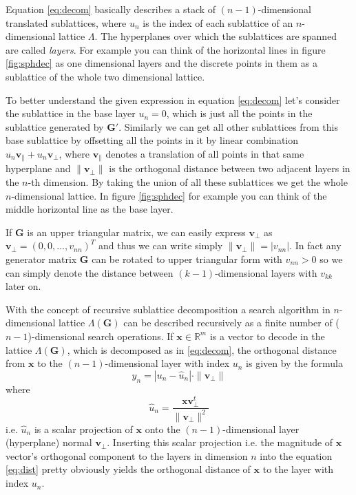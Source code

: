 \documentclass[english,12pt,a4paper,pdftex,sci,utf8]{aaltothesis}
\begin{document}
\noindent Equation \eqref{eq:decom} basically describes a stack of $(n-1)$-dimensional translated sublattices, where $u_n$ is the index of each sublattice of an $n$-dimensional lattice $\Lambda$. The hyperplanes over which the sublattices are spanned are called \textit{layers}. For example you can think of the horizontal lines in figure \ref{fig:sphdec} as one dimensional layers and the discrete points in them as a sublattice of the whole two dimensional lattice. 
\par To better understand the given expression in equation \eqref{eq:decom} let's consider the sublattice in the base layer $u_n = 0$, which is just all the points in the sublattice generated by $\mathbf{G}'$. Similarly we can get all other sublattices from this base sublattice by offsetting all the points in it by linear combination $u_n\mathbf{v}_{\parallel}+u_n\mathbf{v}_{\bot}$, where $\mathbf{v}_{\parallel}$ denotes a translation of all points in that same hyperplane and $\|\mathbf{v}_{\bot}\|$ is the orthogonal distance between two adjacent layers in the $n$-th dimension. By taking the union of all these sublattices we get the whole $n$-dimensional lattice. In figure \ref{fig:sphdec} for example you can think of the middle horizontal line as the base layer.
\par If $\mathbf{G}$ is an upper triangular matrix, we can easily express $\mathbf{v}_{\bot}$ as $\mathbf{v}_{\bot} = (0, 0, ..., v_{nn})^T$ and thus we can write simply $\|\mathbf{v}_{\bot}\| = |v_{nn}|$. In fact any generator matrix $\mathbf{G}$ can be rotated to upper triangular form \cite{agrell} with $v_{nn} > 0$ so we can simply denote the distance between $(k-1)$-dimensional layers with $v_{kk}$ later on.
\par With the concept of recursive sublattice decomposition a search algorithm in $n$-dimensional lattice $\Lambda(\mathbf{G})$ can be described recursively as a finite number of ($n-1$)-dimensional search operations. If $\mathbf{x} \in \mathbb{R}^m$ is a vector to decode in the lattice $\Lambda(\mathbf{G})$, which is decomposed as in \eqref{eq:decom}, the orthogonal distance from $\mathbf{x}$ to the $(n-1)$-dimensional layer with index $u_n$ is given by the formula
\begin{equation}
y_n = |u_n-\hat{u}_n| \cdot \|\mathbf{v}_{\bot}\|
\label{eq:dist}
\end{equation}
where
\begin{equation}
\hat{u}_n = \frac{\mathbf{xv}_{\bot}^t}{\|\mathbf{v}_{\bot}\|^2}
\label{eq:uhat}
\end{equation}
i.e. $\hat{u}_n$ is a scalar projection of $\mathbf{x}$ onto the $(n-1)$-dimensional layer (hyperplane) normal $\mathbf{v}_{\bot}$. Inserting this scalar projection i.e. the magnitude of $\mathbf{x}$ vector's orthogonal component to the layers in dimension $n$ into the equation \eqref{eq:dist} pretty obviously yields the orthogonal distance of $\mathbf{x}$ to the layer with index $u_n$. 
\end{document}
